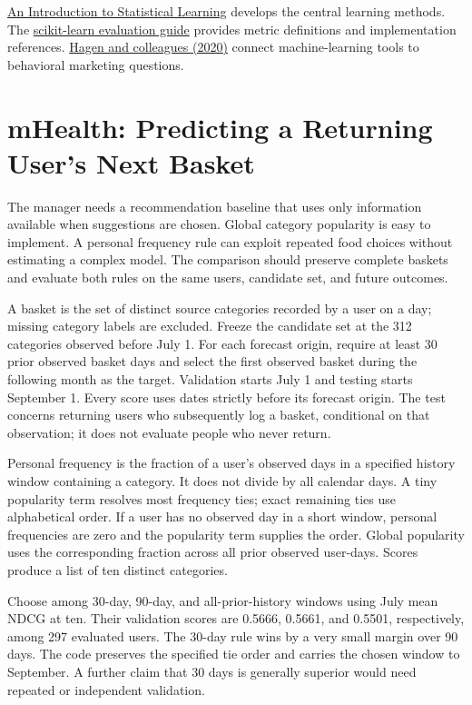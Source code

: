 \href{https://www.statlearning.com/}{An Introduction to Statistical
Learning} develops the central learning methods. The
\href{https://scikit-learn.org/stable/modules/model_evaluation.html}{scikit-learn
evaluation guide} provides metric definitions and implementation
references. \href{https://doi.org/10.1007/s11002-020-09535-7}{Hagen and
colleagues (2020)} connect machine-learning tools to behavioral
marketing questions.

\hypertarget{M07-mhealth-predicting-a-returning-users-next-basket}{%
\section{mHealth: Predicting a Returning User's Next
Basket}\label{M07-mhealth-predicting-a-returning-users-next-basket}}

\noindent The manager needs a recommendation baseline that uses only information
available when suggestions are chosen. Global category popularity is
easy to implement. A personal frequency rule can exploit repeated food
choices without estimating a complex model. The comparison should
preserve complete baskets and evaluate both rules on the same users,
candidate set, and future outcomes.

A basket is the set of distinct source categories recorded by a user on
a day; missing category labels are excluded. Freeze the candidate set at
the 312 categories observed before July 1. For each forecast origin,
require at least 30 prior observed basket days and select the first
observed basket during the following month as the target. Validation
starts July 1 and testing starts September 1. Every score uses dates
strictly before its forecast origin. The test concerns returning users
who subsequently log a basket, conditional on that observation; it does
not evaluate people who never return.

Personal frequency is the fraction of a user's observed days in a
specified history window containing a category. It does not divide by
all calendar days. A tiny popularity term resolves most frequency ties;
exact remaining ties use alphabetical order. If a user has no observed
day in a short window, personal frequencies are zero and the popularity
term supplies the order. Global popularity uses the corresponding
fraction across all prior observed user-days. Scores produce a list of
ten distinct categories.

Choose among 30-day, 90-day, and all-prior-history windows using July
mean NDCG at ten. Their validation scores are 0.5666, 0.5661, and
0.5501, respectively, among 297 evaluated users. The 30-day rule wins by
a very small margin over 90 days. The code preserves the specified tie
order and carries the chosen window to September. A further claim that
30 days is generally superior would need repeated or independent
validation.

